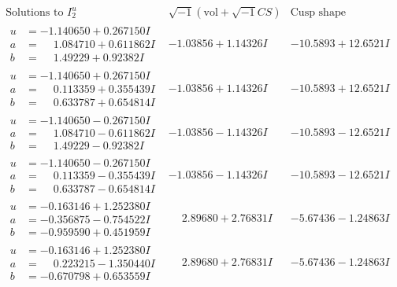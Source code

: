 \documentclass[1p]{elsarticle_modified}
\theoremstyle{definition}
\newcommand{\I}{\sqrt{-1}}
\begin{document}
$$\begin{array}{c|c|c}  
\text{Solutions to }I^u_{2}& \I (\text{vol} + \sqrt{-1}CS) & \text{Cusp shape}\\
 \hline 
\begin{aligned}
u &= -1.140650 + 0.267150 I \\
a &= \phantom{-}1.084710 + 0.611862 I \\
b &= \phantom{-}1.49229 + 0.92382 I\end{aligned}
 & -1.03856 + 1.14326 I & -10.5893 + 12.6521 I \\ \hline\begin{aligned}
u &= -1.140650 + 0.267150 I \\
a &= \phantom{-}0.113359 + 0.355439 I \\
b &= \phantom{-}0.633787 + 0.654814 I\end{aligned}
 & -1.03856 + 1.14326 I & -10.5893 + 12.6521 I \\ \hline\begin{aligned}
u &= -1.140650 - 0.267150 I \\
a &= \phantom{-}1.084710 - 0.611862 I \\
b &= \phantom{-}1.49229 - 0.92382 I\end{aligned}
 & -1.03856 - 1.14326 I & -10.5893 - 12.6521 I \\ \hline\begin{aligned}
u &= -1.140650 - 0.267150 I \\
a &= \phantom{-}0.113359 - 0.355439 I \\
b &= \phantom{-}0.633787 - 0.654814 I\end{aligned}
 & -1.03856 - 1.14326 I & -10.5893 - 12.6521 I \\ \hline\begin{aligned}
u &= -0.163146 + 1.252380 I \\
a &= -0.356875 - 0.754522 I \\
b &= -0.959590 + 0.451959 I\end{aligned}
 & \phantom{-}2.89680 + 2.76831 I & -5.67436 - 1.24863 I \\ \hline\begin{aligned}
u &= -0.163146 + 1.252380 I \\
a &= \phantom{-}0.223215 - 1.350440 I \\
b &= -0.670798 + 0.653559 I\end{aligned}
 & \phantom{-}2.89680 + 2.76831 I & -5.67436 - 1.24863 I \\ \hline\begin{aligned}

\end{aligned}
\end{array}$$
\end{document}
